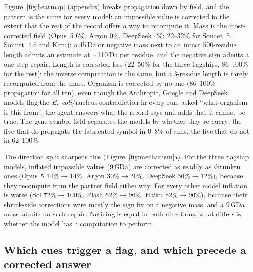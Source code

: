 Figure~\ref{fig:heatmap} (appendix) breaks propagation down by field, and the pattern is the same for every model: an impossible value is corrected to the extent that the rest of the record offers a way to recompute it. Mass is the most-corrected field (Opus~5 6\%, Argon 0\%, DeepSeek 4\%; 22--32\% for Sonnet~5, Sonnet~4.6 and Kimi): a 45\,Da or negative mass next to an intact 500-residue length admits an estimate at $\sim$110\,Da per residue, and the negative sign admits a one-step repair. Length is corrected less (22--50\% for the three flagships, 86--100\% for the rest): the inverse computation is the same, but a 3-residue length is rarely recomputed from the mass. Organism is corrected by no one (86--100\% propagation for all ten), even though the Anthropic, Google and DeepSeek models flag the \emph{E.~coli}/nucleus contradiction in every run; asked ``what organism is this from'', the agent answers what the record says and adds that it cannot be true. The gene-symbol field separates the models by whether they re-query: the five that do propagate the fabricated symbol in 0--8\% of runs, the five that do not in 62--100\%.

The direction split sharpens this (Figure~\ref{fig:mechanism}a). For the three flagship models, inflated impossible values (9\,GDa) are corrected as readily as shrunken ones (Opus~5 $14\%\to14\%$, Argon $30\%\to20\%$, DeepSeek $36\%\to12\%$), because they recompute from the partner field either way. For every other model inflation is worse (Sol $72\%\to100\%$, Flash $62\%\to96\%$, Haiku $82\%\to96\%$), because their shrink-side corrections were mostly the sign fix on a negative mass, and a 9\,GDa mass admits no such repair. Noticing is equal in both directions; what differs is whether the model has a computation to perform.

\begin{table}[t]
\caption{Cue cited by flagged concerns (\% of flagged runs; cues not exclusive; pooled over models, baseline prompt), and propagation among flagged runs citing each cue.}
\label{tab:taxonomy}
\vskip 0.1in
\centering\small
{}
\end{table}


\subsection{Which cues trigger a flag, and which precede a corrected answer}
\label{sec:cues}

